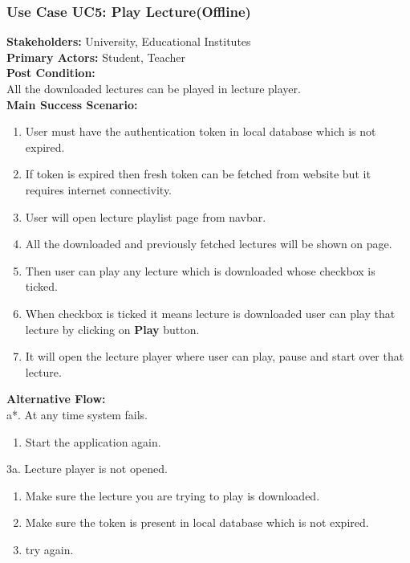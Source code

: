 \documentclass[12pt]{article}
\begin{document}
\subsubsection{Use Case UC5: Play Lecture(Offline)}
\textbf{Stakeholders: } University, Educational Institutes \\
\textbf{Primary Actors: } Student, Teacher \\
\textbf{Post Condition: }\\
All the downloaded lectures can be played in lecture player.\\
\textbf{Main Success Scenario: }
\begin{enumerate}
\item User must have the authentication token in local database which is not expired.
\item If token is expired then fresh token can be fetched from website but it requires internet connectivity.
\item User will open lecture playlist page from navbar.
\item All the downloaded and previously fetched lectures will be shown on page.
\item Then user can play any lecture which is downloaded whose checkbox is ticked.
\item When checkbox is ticked it means lecture is downloaded user can play that lecture by clicking on \textbf{Play} button.
\item It will open the lecture player where user can play, pause and start over that lecture.

\end{enumerate}
\textbf{Alternative Flow: }\\
a*. At any time system fails.
\begin{enumerate}
\item Start the application again.
\end{enumerate}
3a. Lecture player is not opened.
\begin{enumerate}
\item Make sure the lecture you are trying to play is downloaded.
\item Make sure the token is present in local database which is not expired.
\item try again.
\end{enumerate}
\end{document}
